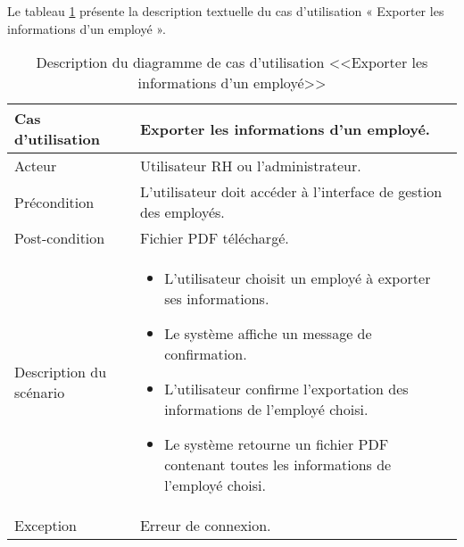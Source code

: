 Le tableau \ref{tab:exportinfoemployé} présente la description textuelle du cas d’utilisation « Exporter les informations d'un employé ».
\begin{longtable}[c]{
    |p{}
    |p{}|
}
    \caption{Description du diagramme de cas d’utilisation <<Exporter les informations d'un employé>>}
    \label{tab:exportinfoemployé}\\
    \hline
    
    Cas d’utilisation
    &  Exporter les informations d'un employé. \\
    \hline 
    
    Acteur
    & Utilisateur RH ou l'administrateur. \\
    \hline 
    
    Précondition
    & L'utilisateur doit accéder à l'interface de gestion des employés. \\
    \hline
    
    Post-condition
    & Fichier PDF téléchargé. \\
    \hline
    
    Description du
scénario

    &     \begin{itemize}
    \item L’utilisateur choisit un employé à exporter ses informations.
    \item Le système affiche un message de confirmation.
     \item L'utilisateur confirme l'exportation des informations de l'employé choisi.
     \item Le système retourne un fichier PDF contenant toutes les informations de l'employé choisi.

    \end{itemize} \\
    \hline
    
   Exception
    & Erreur de connexion.
 \\ \hline
   
\end{longtable}

\newpage

